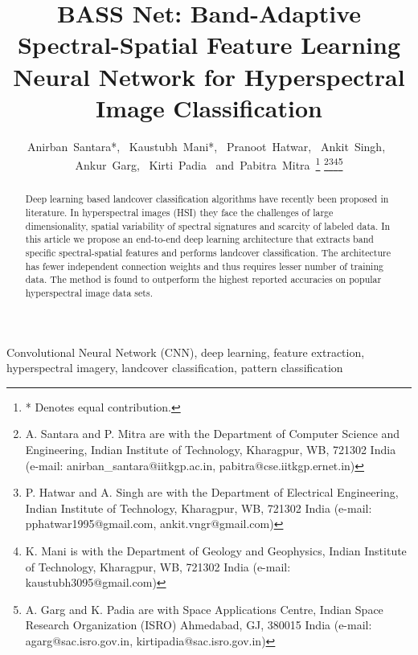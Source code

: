 \documentclass[journal]{IEEEtran}
\begin{document}
\title{BASS Net: Band-Adaptive Spectral-Spatial Feature Learning Neural Network for Hyperspectral Image Classification}


\author{Anirban~Santara*,~\IEEEmembership{}
        Kaustubh~Mani*,~\IEEEmembership{}
        Pranoot~Hatwar,~\IEEEmembership{}
        Ankit~Singh,~\IEEEmembership{}
        Ankur~Garg,~\IEEEmembership{}
        Kirti~Padia~\IEEEmembership{}
        and~Pabitra~Mitra~\IEEEmembership{}\thanks{* Denotes equal contribution.}
\thanks{
A. Santara and P. Mitra are with the Department
of Computer Science and Engineering, Indian Institute of Technology, Kharagpur,
WB, 721302 India (e-mail: anirban\_santara@iitkgp.ac.in, pabitra@cse.iitkgp.ernet.in)}\thanks{P. Hatwar and A. Singh are with the Department
of Electrical Engineering, Indian Institute of Technology, Kharagpur,
WB, 721302 India (e-mail: pphatwar1995@gmail.com, ankit.vngr@gmail.com)}\thanks{K. Mani is with the Department of Geology and Geophysics, Indian Institute of Technology, Kharagpur,
WB, 721302 India (e-mail: kaustubh3095@gmail.com)}\thanks{A. Garg and K. Padia are with Space Applications Centre, Indian Space Research Organization (ISRO) Ahmedabad,
GJ, 380015 India (e-mail: agarg@sac.isro.gov.in, kirtipadia@sac.isro.gov.in)}}



\maketitle
\begin{abstract}
Deep learning based landcover classification algorithms have recently been proposed in literature. In hyperspectral images (HSI) they face the challenges of large dimensionality, spatial variability of spectral signatures and scarcity of labeled data. In this article we propose an end-to-end deep learning architecture that extracts band specific spectral-spatial features and performs landcover classification. The architecture has fewer independent connection weights and thus requires lesser number of training data. The method is found to outperform the highest reported accuracies on popular hyperspectral image data sets.
\end{abstract}

\begin{IEEEkeywords}
Convolutional Neural Network (CNN), deep learning, feature extraction, hyperspectral imagery, landcover classification, pattern classification
\end{IEEEkeywords}
\end{document}
